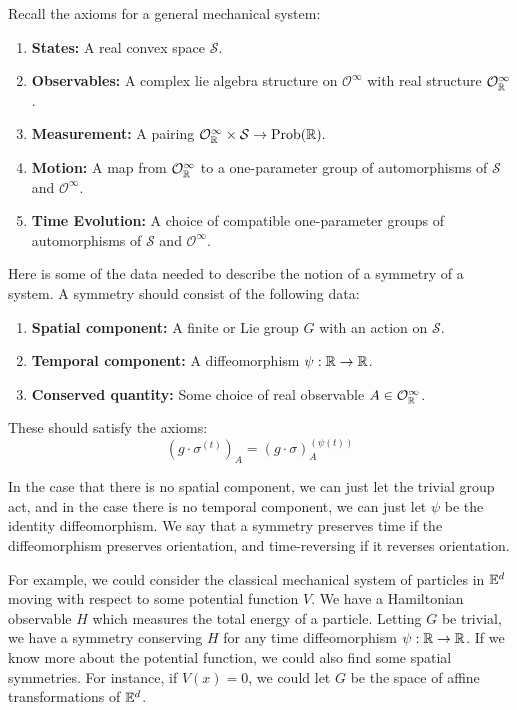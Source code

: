 \documentclass{pset}
\begin{document}
\begin{solution}
    Recall the axioms for a general mechanical system:
    \begin{enumerate}
        \item \textbf{States:} A real convex space $\mathcal{S}$.
        \item \textbf{Observables:} A complex lie algebra structure on $\mathcal{O}^\infty$ with real structure $\mathcal{O}^\infty_{\mathbb{R}}$.
        \item \textbf{Measurement:} A pairing $\mathcal{O}_{\mathbb{R}}^\infty \times \mathcal{S} \to \textrm{Prob}(\mathbb{R}).$
        \item \textbf{Motion:} A map from $\mathcal{O}^\infty_{\mathbb{R}}$ to a one-parameter group of automorphisms of $\mathcal{S}$ and $\mathcal{O}^\infty$.
        \item \textbf{Time Evolution:} A choice of compatible one-parameter groups of automorphisms of $\mathcal{S}$ and $\mathcal{O}^\infty$.
    \end{enumerate}
    Here is some of the data needed to describe the notion of a symmetry of a system. A symmetry should consist of the following data:

    \begin{enumerate}
        \item \textbf{Spatial component:} A finite or Lie group $G$ with an action on $\mathcal{S}$.
        \item \textbf{Temporal component:} A diffeomorphism $\psi : \mathbb{R} \to \mathbb{R}$.
        \item \textbf{Conserved quantity:} Some choice of real observable $A\in \mathcal{O}^\infty_{\mathbb{R}}$.
    \end{enumerate}

    These should satisfy the axioms:
    \[
        (g\cdot \sigma^{(t)})_A = (g\cdot \sigma)^{(\psi(t))}_A
    \]

    In the case that there is no spatial component, we can just let the trivial group act, and in the case there is no temporal component, we can just let $\psi$ be the identity diffeomorphism. We say that a symmetry preserves time if the diffeomorphism preserves orientation, and time-reversing if it reverses orientation.

    For example, we could consider the classical mechanical system of particles in $\mathbb{E}^d$ moving with respect to some potential function $V$. We have a Hamiltonian observable $H$ which measures the total energy of a particle. Letting $G$ be trivial, we have a symmetry conserving $H$ for any time diffeomorphism $\psi : \mathbb{R} \to \mathbb{R}$. If we know more about the potential function, we could also find some spatial symmetries. For instance, if $V(x)=0$, we could let $G$ be the space of affine transformations of $\mathbb{E}^d$.

\end{solution}
\end{document}
